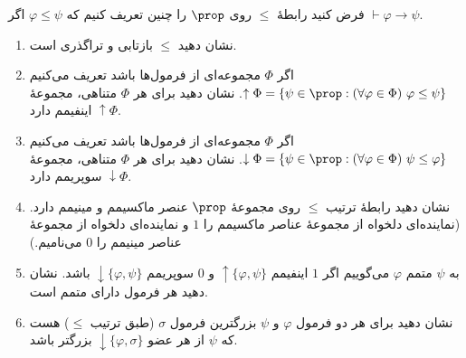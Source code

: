 فرض کنید رابطهٔ
$\leq$
روی
$\prop$
را چنین تعریف کنیم که
$\varphi\leq\psi$
اگر
$\vdash\varphi\to\psi$.
\begin{enumerate}[label=(\alph*)]
    \item نشان دهید
    $\leq$
    بازتابی و تراگذری است.%
    \item اگر
    $\Phi$
    مجموعه‌ای از فرمول‌ها باشد تعریف می‌کنیم
    $\uparrow\Phi=\{\psi\in\prop : (\forall\varphi\in\Phi)\ \varphi\leq\psi\}$.
    نشان دهید برای هر
    $\Phi$
    متناهی، مجموعهٔ
    $\uparrow\Phi$
    اینفیمم دارد.
    \item اگر
    $\Phi$
    مجموعه‌ای از فرمول‌ها باشد تعریف می‌کنیم
    $\downarrow\Phi=\{\psi\in\prop : (\forall\varphi\in\Phi)\ \psi\leq\varphi\}$.
    نشان دهید برای هر
    $\Phi$
    متناهی، مجموعهٔ
    $\downarrow\Phi$
    سوپریمم دارد.
    \item نشان دهید رابطهٔ ترتیب
    $\leq$
    روی مجموعهٔ
    $\prop$
    عنصر ماکسیمم و مینیمم دارد.
    (نماینده‌ای دلخواه از مجموعهٔ عناصر ماکسیمم را $1$ و نماینده‌ای دلخواه از مجموعهٔ عناصر مینیمم را $0$ می‌نامیم.)
    \item به
    $\psi$
    متمم
    $\varphi$
    می‌گوییم اگر
    $1$
    اینفیمم
    $\uparrow\{\varphi,\psi\}$
    و
    $0$
    سوپریمم
    $\downarrow\{\varphi,\psi\}$
    باشد. نشان دهید هر فرمول دارای متمم است.
    \item نشان دهید برای هر دو فرمول
    $\varphi$
    و
    $\psi$
    بزرگترین فرمول
    $\sigma$
    (طبق ترتیب $\leq$)
    هست که
    $\psi$
    از هر عضو
    $\downarrow\{\varphi,\sigma\}$
    بزرگتر باشد.
\end{enumerate}\quad\vspace{-9mm}

